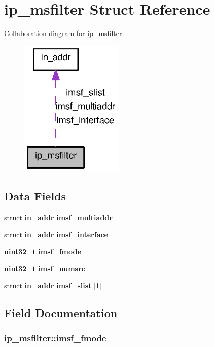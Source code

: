 \section{ip\_\-msfilter Struct Reference}
\label{structip__msfilter}


Collaboration diagram for ip\_\-msfilter:
\nopagebreak
\begin{figure}[H]
\begin{center}
\leavevmode
\includegraphics[width=138pt]{structip__msfilter__coll__graph}
\end{center}
\end{figure}
\subsection*{Data Fields}
\begin{DoxyCompactItemize}
\item 
struct {\bf in\_\-addr} {\bf imsf\_\-multiaddr}
\item 
struct {\bf in\_\-addr} {\bf imsf\_\-interface}
\item 
{\bf uint32\_\-t} {\bf imsf\_\-fmode}
\item 
{\bf uint32\_\-t} {\bf imsf\_\-numsrc}
\item 
struct {\bf in\_\-addr} {\bf imsf\_\-slist} [1]
\end{DoxyCompactItemize}


\subsection{Field Documentation}
\subsubsection[{imsf\_\-fmode}]{ {\bf ip\_\-msfilter::imsf\_\-fmode}}\label{structip__msfilter_aa38a8a99b6189ab1e51e9eb31e9a2335}
